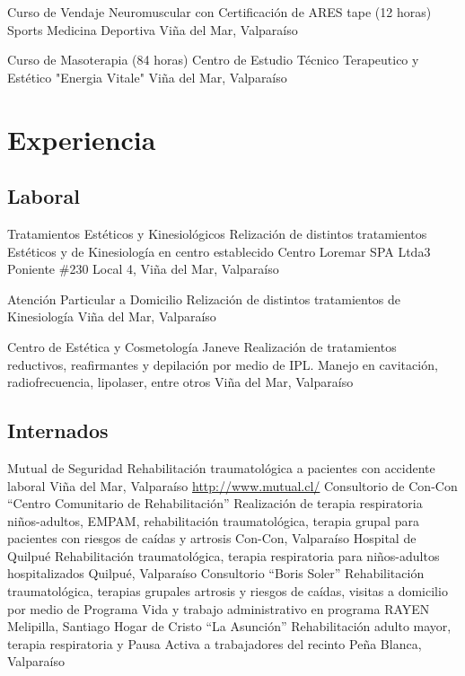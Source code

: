\documentclass[11pt,a4paper,sans]{moderncv}
\begin{document}
        {Curso de Vendaje Neuromuscular con Certificación de ARES tape (12 horas)}
        {Sports Medicina Deportiva}
        {Viña del Mar, Valparaíso}
        {}
        {}

        {Curso de Masoterapia (84 horas)}
        {Centro de Estudio Técnico Terapeutico y Estético "Energia Vitale"}
        {Viña del Mar, Valparaíso}
        {}
        {}

\section{Experiencia}
\subsection{Laboral}
        {Tratamientos Estéticos y Kinesiológicos}
        {Relización de distintos tratamientos Estéticos y de Kinesiología en centro establecido}
        {}
        {Centro Loremar SPA Ltda}{3 Poniente \#230 Local 4, Viña del Mar, Valparaíso}

        {Atención Particular a Domicilio}
        {Relización de distintos tratamientos de Kinesiología}
        {}
        {}{Viña del Mar, Valparaíso}

        {Centro de Estética y Cosmetología Janeve}
        {Realización de tratamientos reductivos, reafirmantes y depilación por medio de IPL. Manejo en cavitación, radiofrecuencia, lipolaser, entre otros}
        {}
        {}{Viña del Mar, Valparaíso}

\subsection{Internados}

        {Mutual de Seguridad}
        {Rehabilitación traumatológica a pacientes con accidente laboral}
        {}
        {Viña del Mar, Valparaíso}
        {\url{http://www.mutual.cl/}}
        {Consultorio de Con-Con ``Centro Comunitario de Rehabilitación''}
        {Realización de terapia respiratoria niños-adultos, EMPAM, rehabilitación traumatológica, terapia grupal para pacientes con riesgos de caídas y artrosis}
        {}
        {}
        {Con-Con, Valparaíso}
        {Hospital de Quilpué}
        {Rehabilitación traumatológica, terapia respiratoria para niños-adultos hospitalizados}
        {}
        {}
        {Quilpué, Valparaíso}
        {Consultorio ``Boris Soler''}
        {Rehabilitación traumatológica, terapias grupales artrosis y riesgos de caídas, visitas a domicilio por medio de Programa Vida y trabajo administrativo en programa RAYEN}
        {}
        {}
        {Melipilla, Santiago}
        {Hogar de Cristo ``La Asunción''}
        {Rehabilitación adulto mayor, terapia respiratoria y Pausa Activa a trabajadores del recinto}
        {}
        {}
        {Peña Blanca, Valparaíso}
\end{document}
